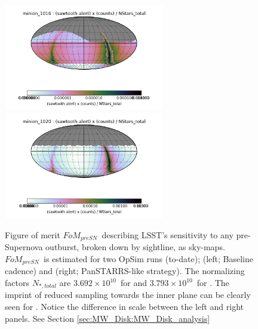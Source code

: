 \begin{figure}
\begin{center}
  \includegraphics[width=7cm]{./figs/milkyway/galacticSN_SkyMap_Baseline.png}
  \includegraphics[width=7cm]{./figs/milkyway/galacticSN_SkyMap_PanSTARRS.png}
  \caption{Figure of merit $FoM_{preSN}$~describing LSST's sensitivity to any pre-Supernova outburst, broken down by sightline, as sky-maps. $FoM_{preSN}$~is estimated for two OpSim runs (to-date);  (left; Baseline cadence) and  (right; PanSTARRS-like strategy). The normalizing factors $N_{\ast, total}$ are $3.692\times 10^{10}$~for  and $3.793 \times 10^{10}$~for . The imprint of reduced sampling towards the inner plane can be clearly seen for . Notice the difference in scale between the left and right panels. See Section \ref{sec:MW_Disk:MW_Disk_analysis}}
\end{center}
\label{f_opSim_GalacticSN}
\end{figure}






